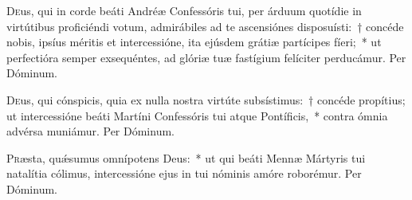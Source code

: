 \documentclass[vesperale_romanum]{subfiles}
\begin{document}
\oratio

\lettrine{D}{e}us, qui in corde beáti Andréæ Confessóris tui, per árduum quotídie in virtútibus proficiéndi votum, admirábiles ad te ascensiónes disposuísti:~† concéde nobis, ipsíus méritis et intercessióne, ita ejúsdem grátiæ partícipes fíeri;~* ut perfectióra semper exsequéntes, ad glóriæ tuæ fastígium felíciter perducámur. Per Dóminum.


\myrule


\duplex




\admagnificat


\oratio

\lettrine{D}{e}us, qui cónspicis, quia ex nulla nostra virtúte subsístimus:~† concéde propítius; ut intercessióne beáti Martíni Confessóris tui atque Pontíficis,~* contra ó\-mnia advérsa muniámur. Per Dóminum.



\oratio

\lettrine{P}{r}æsta, quǽsumus omnípotens Deus:~* ut qui beáti Mennæ Mártyris tui natalítia cólimus, intercessióne ejus in tui nóminis amóre roborémur.
Per Dóminum.



\label{110_7c_nov}
\end{document}
